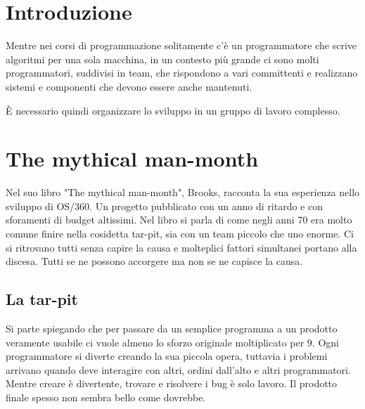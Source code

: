 \documentclass[a4paper,12pt,titlepage,oneside]{book}
\begin{document}
\tableofcontents
\chapter{Introduzione}
Mentre nei corsi di programmazione solitamente c'è un programmatore che scrive algoritmi per una sola macchina, in un contesto più grande ci sono molti programmatori, suddivisi in team, che rispondono a vari committenti e realizzano sistemi e componenti che devono essere anche mantenuti.

È necessario quindi organizzare lo sviluppo in un gruppo di lavoro complesso.

\chapter{The mythical man-month}
Nel suo libro "The mythical man-month", Brooks, racconta la sua esperienza nello sviluppo di OS/360. Un progetto pubblicato con un anno di ritardo e con sforamenti di budget altissimi.
Nel libro si parla di come negli anni 70 era molto comune finire nella cosidetta tar-pit, sia con un team piccolo che uno enorme. Ci si ritrovano tutti senza capire la causa e molteplici fattori simultanei portano alla discesa. Tutti se ne possono accorgere ma non se ne capisce la causa.

\section{La tar-pit}
Si parte spiegando che per passare da un semplice programma a un prodotto veramente usabile ci vuole almeno lo sforzo originale moltiplicato per 9.
Ogni programmatore si diverte creando la sua piccola opera, tuttavia i problemi arrivano quando deve interagire con altri, ordini dall'alto e altri programmatori. Mentre creare è divertente, trovare e risolvere i bug è solo lavoro. Il prodotto finale spesso non sembra bello come dovrebbe.
\end{document}
